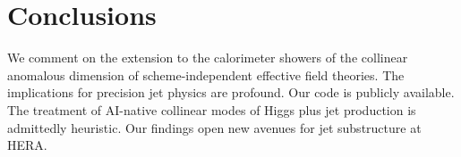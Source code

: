 \section{Conclusions}\label{sec:conclusions}

We comment on the extension to the calorimeter showers of the collinear
anomalous dimension of scheme-independent effective field theories. The
implications for precision jet physics are profound. Our code is
publicly available. The treatment of AI-native collinear modes of Higgs
plus jet production is admittedly heuristic. Our findings open new
avenues for jet substructure at HERA.

